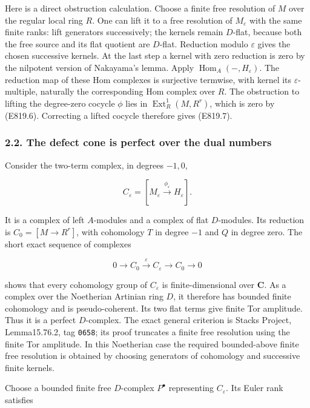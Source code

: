 Here is a direct obstruction calculation. Choose a finite free
resolution of \(M\) over the regular local ring \(R\). One can lift it
to a free resolution of \(M_\varepsilon\) with the same finite ranks:
lift generators successively; the kernels remain \(D\)-flat, because
both the free source and its flat quotient are \(D\)-flat. Reduction
modulo \(\varepsilon\) gives the chosen successive kernels. At the last
step a kernel with zero reduction is zero by the nilpotent version of
Nakayama's lemma. Apply \(\operatorname{Hom}_A(-,H_\varepsilon)\). The
reduction map of these Hom complexes is surjective termwise, with kernel
its \(\varepsilon\)-multiple, naturally the corresponding Hom complex
over \(R\). The obstruction to lifting the degree-zero cocycle \(\phi\)
lies in \(\operatorname{Ext}^1_R(M,R^r)\), which is zero by (E819.6).
Correcting a lifted cocycle therefore gives (E819.7).

\subsubsection{2.2. The defect cone is perfect over the dual
numbers}\label{SF-E819-the-defect-cone-is-perfect-over-the-dual-numbers}

Consider the two-term complex, in degrees \(-1,0\),

\[
 C_\varepsilon=[M_\varepsilon\xrightarrow{\phi_\varepsilon}H_\varepsilon].
 \tag{E819.8}
\]

It is a complex of left \(A\)-modules and a complex of flat
\(D\)-modules. Its reduction is \(C_0=[M\to R^r]\), with cohomology
\(T\) in degree \(-1\) and \(Q\) in degree zero. The short exact
sequence of complexes

\[
 0\longrightarrow C_0\xrightarrow{\varepsilon} C_\varepsilon
      \longrightarrow C_0\longrightarrow0
\]

shows that every cohomology group of \(C_\varepsilon\) is
finite-dimensional over \(\mathbf C\). As a complex over the Noetherian
Artinian ring \(D\), it therefore has bounded finite cohomology and is
pseudo-coherent. Its two flat terms give finite Tor amplitude. Thus it
is a perfect \(D\)-complex. The exact general criterion is Stacks
Project, Lemma15.76.2, tag \texttt{0658}; its proof truncates a finite
free resolution using the finite Tor amplitude. In this Noetherian case
the required bounded-above finite free resolution is obtained by
choosing generators of cohomology and successive finite kernels.

Choose a bounded finite free \(D\)-complex \(P^\bullet\) representing
\(C_\varepsilon\). Its Euler rank satisfies


